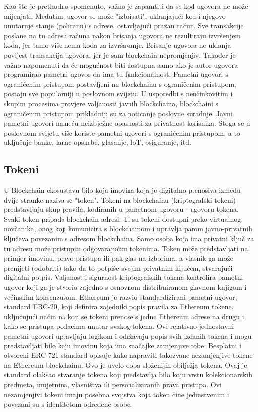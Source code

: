 \documentclass[times, utf8, diplomski]{fer}
\begin{document}
Kao što je prethodno spomenuto, važno je zapamtiti da se kod ugovora ne može mijenjati. Međutim, ugovor se može "izbrisati", uklanjajući kod i njegovo unutarnje stanje (pohranu) s adrese, ostavljajući prazan račun. Sve transakcije poslane na tu adresu računa nakon brisanja ugovora ne rezultiraju izvršenjem koda, jer tamo više nema koda za izvršavanje. Brisanje ugovora ne uklanja povijest transakcija ugovora,  jer je sam blockchain nepromjenjiv. Također je važno napomenuti da će mogućnost biti dostupna samo ako je autor ugovora programirao pametni ugovor da ima tu funkcionalnost.
Pametni ugovori s ograničenim pristupom postavljeni na blockchainu s ograničenim pristupom, postaju sve popularniji u poslovnom svijetu. U usporedbi s neučinkovitim i skupim procesima provjere valjanosti javnih blockchaina, blockchaini s ograničenim pristupom prikladniji su za poticanje poslovne suradnje. Javni pametni ugovori nameću neizbježne opasnosti za privatnost korisnika. Stoga se u poslovnom svijetu više koriste pametni ugovori s ograničenim pristupom, a to uključuje banke, lanac opskrbe, glasanje, IoT, osiguranje, itd.

\subsection{Tokeni}

U Blockchain ekosustavu bilo koja imovina koja je digitalno prenosiva između dvije stranke naziva se "token". Tokeni na blockchainu (kriptografski tokeni) predstavljaju skup pravila, kodiranih u pametnom ugovoru - ugovoru tokena. Svaki token pripada blockchain adresi. Ti su tokeni dostupni preko virtualnog novčanika, onog koji komunicira s blockchainom i upravlja parom javno-privatnih ključeva povezanim s adresom blockchaina. Samo osoba koja ima privatni ključ za tu adresu može pristupiti odgovarajućim tokenima. Token može predstavljati na primjer imovinu, pravo pristupa ili pak glas na izborima, a vlasnik ga može prenijeti (odobriti) tako da to potpiše svojim privatnim ključem, stvarajući digitalni potpis. Valjanost i sigurnost kriptografskih tokena kontrolira pametni ugovor koji ga je stvorio zajedno s osnovnom distribuiranom glavnom knjigom i većinskim konsenzusom.
Ethereum je razvio standardizirani pametni ugovor, standard ERC-20, koji definira zajedniki popis pravila za Ethereum tokene, uključujući način na koji se tokeni prenose s jedne Ethereum adrese na drugu i kako se pristupa podacima unutar svakog tokena. Ovi relativno jednostavni pametni ugovori upravljaju logikom i održavaju popis svih izdanih tokena i mogu predstavljati bilo koju imovinu koja ima značajke zamjenjive robe.
Besplatni i otvoreni ERC-721 standard opisuje kako napraviti takozvane nezamjenjive tokene na Ethereum blockchainu. Ovo je uvelo doba složenijih obilježja tokena.  Ovaj je standard olakšao stvaranje tokena koji predstavlja bilo koju vrstu kolekcionarskih predmeta, umjetnina, vlasništva ili personaliziranih prava pristupa. Ovi nezamjenjivi tokeni imaju posebna svojstva koja token čine jedinstvenim i povezani su s identitetom određene osobe.
\end{document}
